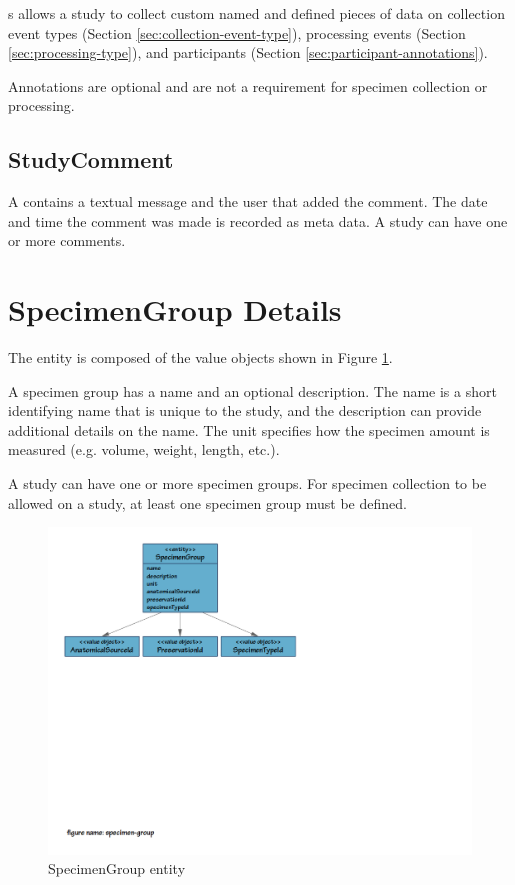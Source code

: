s allows a study to collect custom named and
defined pieces of data on collection event types (Section
\ref{sec:collection-event-type}), processing events (Section
\ref{sec:processing-type}), and participants (Section
\ref{sec:participant-annotations}).

Annotations are optional and are not a requirement for specimen collection or
processing.

\subsection*{StudyComment}

A  contains a textual message and the user that
added the comment. The date and time the comment was made is recorded as meta
data. A study can have one or more comments.

\section{SpecimenGroup Details}
\label{sec:specimen-group}

The  entity is composed of the value objects shown
in Figure \ref{fig:specimen-group}.

A specimen group has a name and an optional description. The name is a short
identifying name that is unique to the study, and the description can provide
additional details on the name. The unit specifies how the specimen amount is
measured (e.g. volume, weight, length, etc.).

A study can have one or more specimen groups. For specimen collection to be
allowed on a study, at least one specimen group must be defined.

\begin{figure}[H]
  \centering
  \includegraphics[trim={9mm 130mm 80mm 9mm}, clip,
    width=1\textwidth]{images/specimen-group}
  \caption{SpecimenGroup entity}
  \label{fig:specimen-group}
\end{figure}

